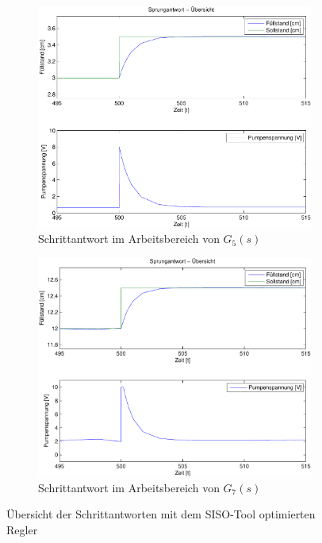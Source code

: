 \begin{figure}[h!]
	\centering
	\begin{subfigure}{0.475\textwidth}
		\includegraphics[width=1\textwidth]{11/L5_step_overview_plot.pdf}
		\caption{Schrittantwort im Arbeitsbereich von $G_5(s)$}
	\end{subfigure}
	\hfill{}
	\begin{subfigure}{0.475\textwidth}
		\includegraphics[width=1\textwidth]{11/L7_step_overview_plot.pdf}
		\caption{Schrittantwort im Arbeitsbereich von $G_7(s)$}
	\end{subfigure}
	\caption{Übersicht der Schrittantworten mit dem SISO-Tool optimierten Regler}
\end{figure}

